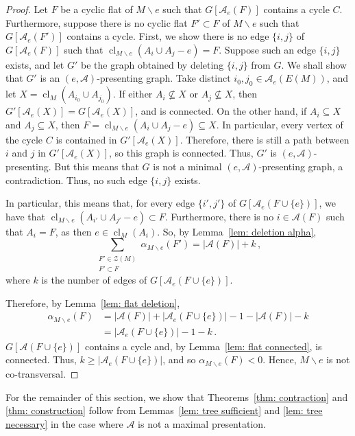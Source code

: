 \documentclass[11pt, reqno]{amsart}
\DeclareMathOperator{\cl}{cl}
\begin{document}
\begin{proof}
Let $F$ be a cyclic flat of $M \backslash e$ such that $G[\mathcal A_e(F)]$ contains a cycle $C$. Furthermore, suppose there is no cyclic flat $F' \subset F$ of $M \backslash e$ such that $G[\mathcal A_e(F')]$ contains a cycle. First, we show there is no edge $\{i,j\}$ of $G[\mathcal A_e(F)]$ such that $\cl_{M \backslash e}(A_i \cup A_j - e) = F$. Suppose such an edge $\{i,j\}$ exists, and let $G'$ be the graph obtained by deleting $\{i,j\}$ from $G$. We shall show that $G'$ is an $(e, \mathcal A)$-presenting graph. Take distinct $i_0, j_0 \in \mathcal A_e(E(M))$, and let $X = \cl_M(A_{i_0} \cup A_{j_0})$. If either $A_i \not\subseteq X$ or $A_j \not\subseteq X$, then $G'[\mathcal A_e(X)] = G[\mathcal A_e(X)]$, and is connected. On the other hand, if $A_i \subseteq X$ and $A_j \subseteq X$, then $F = \cl_{M \backslash e}(A_i \cup A_j - e) \subseteq X$. In particular, every vertex of the cycle $C$ is contained in $G'[\mathcal A_e(X)]$. Therefore, there is still a path between $i$ and $j$ in $G'[\mathcal A_e(X)]$, so this graph is connected. Thus, $G'$ is $(e, \mathcal A)$-presenting. But this means that $G$ is not a minimal $(e, \mathcal A)$-presenting graph, a contradiction. Thus, no such edge $\{i,j\}$ exists.

In particular, this means that, for every edge $\{i',j'\}$ of $G[\mathcal A_e(F \cup \{e\})]$, we have that $\cl_{M \backslash e}(A_{i'} \cup A_{j'} - e) \subset F$. Furthermore, there is no $i \in \mathcal A(F)$ such that $A_i = F$, as then $e \in \cl_M(A_i)$. So, by Lemma~\ref{lem: deletion alpha},
$$
\sum_{\substack{F' \in \mathcal Z(M) \\ F' \subset F}} \alpha_{M \backslash e}(F') = |\mathcal A(F)| + k \,,
$$
where $k$ is the number of edges of $G[\mathcal A_e(F \cup \{e\})]$.

Therefore, by Lemma~\ref{lem: flat deletion},
\begin{align*}
\alpha_{M \backslash e}(F) &= |\mathcal A(F)| + |\mathcal A_e(F \cup \{e\})| - 1 - |\mathcal A(F)| - k \\
&= |\mathcal A_e(F \cup \{e\})| - 1 - k \,.
\end{align*}
$G[\mathcal A(F \cup \{e\})]$ contains a cycle and, by Lemma~\ref{lem: flat connected}, is connected. Thus, $k \geq |\mathcal A_e(F \cup \{e\})|$, and so $\alpha_{M \backslash e}(F) < 0$. Hence, $M \backslash e$ is not co-transversal.
\end{proof}

For the remainder of this section, we show that Theorems~\ref{thm: contraction} and \ref{thm: construction} follow from Lemmas~\ref{lem: tree sufficient} and \ref{lem: tree necessary} in the case where $\mathcal A$ is not a maximal presentation.
\end{document}
